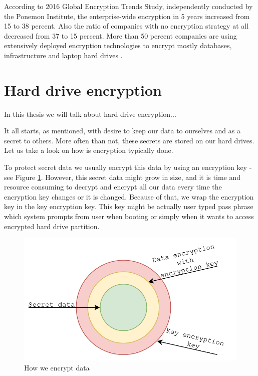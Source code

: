 According to 2016 Global Encryption Trends Study, independently conducted by the Ponemon Institute, the enterprise-wide encryption in 5 years increased from 15 to 38 percent.
Also the ratio of companies with no encryption strategy at all decreased from 37 to 15 percent.
More than 50 percent companies are using extensively deployed encryption technologies to encrypt mostly databases, infrastructure and laptop hard drives \cite{Thales}.

\section{Hard drive encryption}

In this thesis we will talk about hard drive encryption... 

It all starts, as mentioned, with desire to keep our data to ourselves and as a secret to others.
More often than not, these secrets are stored on our hard drives.
Let us take a look on how is encryption typically done.

To protect secret data we usually encrypt this data by using an encryption key - see Figure \ref{fig:encdata}.
However, this secret data might grow in size, and it is time and resource consuming to decrypt and encrypt all our data every time the encryption key changes or it is changed.
Because of that, we wrap the encryption key in the key encryption key.
This key might be actually user typed pass phrase which system prompts from user when booting or simply when it wants to access encrypted hard drive partition.


\begin{figure}[h]
    \centering
    \includegraphics[scale=0.7]{figures/HowWeEncryptData.pdf}
    \caption{How we encrypt data}
    \label{fig:encdata}
\end{figure}

